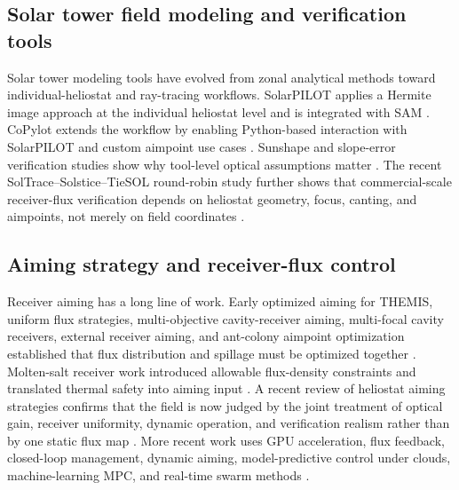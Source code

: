 \documentclass[final,3p,times]{elsarticle}
\begin{document}
\subsection{Solar tower field modeling and verification tools}
Solar tower modeling tools have evolved from zonal analytical methods toward individual-heliostat and ray-tracing workflows. SolarPILOT applies a Hermite image approach at the individual heliostat level and is integrated with SAM \cite{wagner2018solarpilot,nrel2025pysam}. CoPylot extends the workflow by enabling Python-based interaction with SolarPILOT and custom aimpoint use cases \cite{hamilton2022copilot}. Sunshape and slope-error verification studies show why tool-level optical assumptions matter \cite{wang2020sunshape}. The recent SolTrace--Solstice--TieSOL round-robin study further shows that commercial-scale receiver-flux verification depends on heliostat geometry, focus, canting, and aimpoints, not merely on field coordinates \cite{mitchell2025roundrobin}.

\subsection{Aiming strategy and receiver-flux control}
Receiver aiming has a long line of work. Early optimized aiming for THEMIS, uniform flux strategies, multi-objective cavity-receiver aiming, multi-focal cavity receivers, external receiver aiming, and ant-colony aimpoint optimization established that flux distribution and spillage must be optimized together \cite{salome2013themis,besarati2014uniform,wang2017nsga,yu2014multifocal,astolfi2017external,belhomme2014ant}. Molten-salt receiver work introduced allowable flux-density constraints and translated thermal safety into aiming input \cite{sanchez2017towards,sanchez2017allowable,sanchez2020allowable}. A recent review of heliostat aiming strategies confirms that the field is now judged by the joint treatment of optical gain, receiver uniformity, dynamic operation, and verification realism rather than by one static flux map \cite{li2026aimingreview}. More recent work uses GPU acceleration, flux feedback, closed-loop management, dynamic aiming, model-predictive control under clouds, machine-learning MPC, and real-time swarm methods \cite{oberkirsch2021gpu,acosta2021fluxfeedback,oberkirsch2023closedloop,richter2021dynamic,zhu2023mpc,wu2026mlmpc,zhu2024swarm}.
\end{document}
